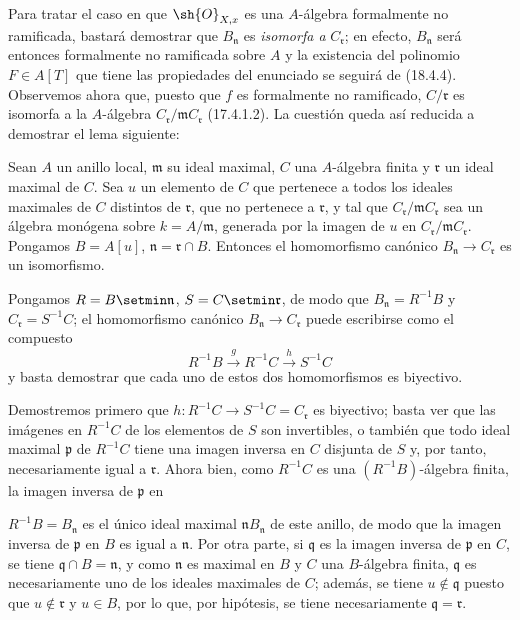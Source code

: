 Para tratar el caso en que $\sh{O}_{X,x}$ es una $A$-álgebra formalmente no ramificada, bastará demostrar que $B_{\mathfrak n}$ es \emph{isomorfa a} $C_{\mathfrak r}$; en efecto, $B_{\mathfrak n}$ será entonces formalmente no ramificada sobre $A$ y la existencia del polinomio $F\in A[T]$ que tiene las propiedades del enunciado se seguirá de (18.4.4). Observemos ahora que, puesto que $f$ es formalmente no ramificado, $C/\mathfrak r$ es isomorfa a la $A$-álgebra $C_{\mathfrak r}/\mathfrak mC_{\mathfrak r}$ (17.4.1.2). La cuestión queda así reducida a demostrar el lema siguiente:

\begin{lemma}[18.4.6.1]
\label{IV.18.4.6.1}
Sean $A$ un anillo local, $\mathfrak m$ su ideal maximal, $C$ una $A$-álgebra finita y $\mathfrak r$ un ideal maximal de $C$. Sea $u$ un elemento de $C$ que pertenece a todos los ideales maximales de $C$ distintos de $\mathfrak r$, que no pertenece a $\mathfrak r$, y tal que $C_{\mathfrak r}/\mathfrak mC_{\mathfrak r}$ sea un álgebra monógena sobre $k=A/\mathfrak m$, generada por la imagen de $u$ en $C_{\mathfrak r}/\mathfrak mC_{\mathfrak r}$. Pongamos $B=A[u]$, $\mathfrak n=\mathfrak r\cap B$. Entonces el homomorfismo canónico $B_{\mathfrak n}\to C_{\mathfrak r}$ es un isomorfismo.
\end{lemma}

Pongamos $R=B\setmin\mathfrak n$, $S=C\setmin\mathfrak r$, de modo que $B_{\mathfrak n}=R^{-1}B$ y $C_{\mathfrak r}=S^{-1}C$; el homomorfismo canónico $B_{\mathfrak n}\to C_{\mathfrak r}$ puede escribirse como el compuesto
\[
  R^{-1}B\xrightarrow{g}R^{-1}C\xrightarrow{h}S^{-1}C
\]
y basta demostrar que cada uno de estos dos homomorfismos es biyectivo.

Demostremos primero que $h:R^{-1}C\to S^{-1}C=C_{\mathfrak r}$ es biyectivo; basta ver que las imágenes en $R^{-1}C$ de los elementos de $S$ son invertibles, o también que todo ideal maximal $\mathfrak p$ de $R^{-1}C$ tiene una imagen inversa en $C$ disjunta de $S$ y, por tanto, necesariamente igual a $\mathfrak r$. Ahora bien, como $R^{-1}C$ es una $(R^{-1}B)$-álgebra finita, la imagen inversa de $\mathfrak p$ en


$R^{-1}B=B_{\mathfrak n}$ es el único ideal maximal $\mathfrak nB_{\mathfrak n}$ de este anillo, de modo que la imagen inversa de $\mathfrak p$ en $B$ es igual a $\mathfrak n$. Por otra parte, si $\mathfrak q$ es la imagen inversa de $\mathfrak p$ en $C$, se tiene $\mathfrak q\cap B=\mathfrak n$, y como $\mathfrak n$ es maximal en $B$ y $C$ una $B$-álgebra finita, $\mathfrak q$ es necesariamente uno de los ideales maximales de $C$; además, se tiene $u\notin\mathfrak q$ puesto que $u\notin\mathfrak r$ y $u\in B$, por lo que, por hipótesis, se tiene necesariamente $\mathfrak q=\mathfrak r$.

